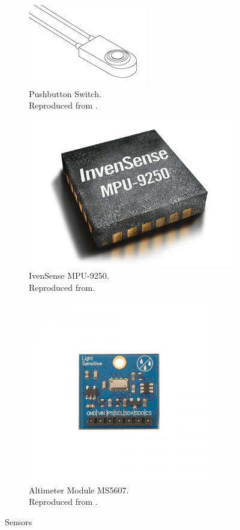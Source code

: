 \begin{figure}[H]
\begin{subfigure}{0.5\textwidth}
\includegraphics[scale=0.3]{3.png}
\caption{Pushbutton Switch.\\
Reproduced from \cite{cpi}.}
\label{fig:p}
\end{subfigure}
\begin{subfigure}{0.5\textwidth}
\centering
\includegraphics[scale=0.1]{2.png}
\caption{IvenSense MPU-9250.\\
Reproduced from\cite{iven}.}
\label{fig:att}
\end{subfigure}
\begin{subfigure}{0.5\textwidth}
\centering
\includegraphics[scale=0.3]{1.png}
\caption{Altimeter Module MS5607.\\ Reproduced from \cite{par}.}
\label{fig:pres}
\end{subfigure}
\caption{Sensors}
\label{fig:sensors}
\end{figure}

